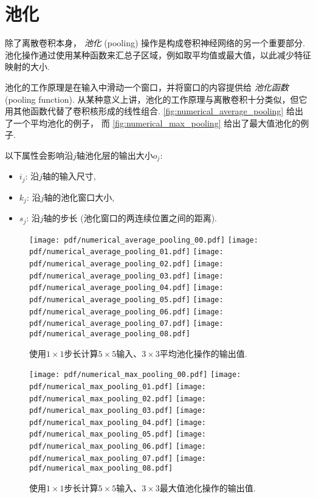 \documentclass[notitlepage]{ctexrep}
\begin{document}
\section{池化}

除了离散卷积本身， {\em 池化\/} (pooling) 操作是构成卷积神经网络的另一个重要部分. 池化操作通过使用某种函数来汇总子区域，例如取平均值或最大值，以此减少特征映射的大小.

池化的工作原理是在输入中滑动一个窗口，并将窗口的内容提供给 {\em 池化函数} (pooling function). 从某种意义上讲，池化的工作原理与离散卷积十分类似，但它用其他函数代替了卷积核形成的线性组合. \autoref{fig:numerical_average_pooling}
给出了一个平均池化的例子， 而 \autoref{fig:numerical_max_pooling}
给出了最大值池化的例子.

以下属性会影响沿$j$轴池化层的输出大小$o_j$: 

\begin{itemize}
    \item $i_j$: 沿$j$轴的输入尺寸,
    \item $k_j$: 沿$j$轴的池化窗口大小,
    \item $s_j$: 沿$j$轴的步长 (池化窗口的两连续位置之间的距离).
\end{itemize}

\begin{figure}[p]
    \centering
    \texttt{[image: pdf/numerical\_average\_pooling\_00.pdf]}
    \texttt{[image: pdf/numerical\_average\_pooling\_01.pdf]}
    \texttt{[image: pdf/numerical\_average\_pooling\_02.pdf]}
    \texttt{[image: pdf/numerical\_average\_pooling\_03.pdf]}
    \texttt{[image: pdf/numerical\_average\_pooling\_04.pdf]}
    \texttt{[image: pdf/numerical\_average\_pooling\_05.pdf]}
    \texttt{[image: pdf/numerical\_average\_pooling\_06.pdf]}
    \texttt{[image: pdf/numerical\_average\_pooling\_07.pdf]}
    \texttt{[image: pdf/numerical\_average\_pooling\_08.pdf]}
    \caption{\label{fig:numerical_average_pooling} 使用$1 \times 1$步长计算$5 \times 5$输入、$3 \times 3$平均池化操作的输出值.}
\end{figure}

\begin{figure}[p]
    \centering
    \texttt{[image: pdf/numerical\_max\_pooling\_00.pdf]}
    \texttt{[image: pdf/numerical\_max\_pooling\_01.pdf]}
    \texttt{[image: pdf/numerical\_max\_pooling\_02.pdf]}
    \texttt{[image: pdf/numerical\_max\_pooling\_03.pdf]}
    \texttt{[image: pdf/numerical\_max\_pooling\_04.pdf]}
    \texttt{[image: pdf/numerical\_max\_pooling\_05.pdf]}
    \texttt{[image: pdf/numerical\_max\_pooling\_06.pdf]}
    \texttt{[image: pdf/numerical\_max\_pooling\_07.pdf]}
    \texttt{[image: pdf/numerical\_max\_pooling\_08.pdf]}
    \caption{\label{fig:numerical_max_pooling} 使用$1 \times 1$步长计算$5 \times 5$输入、$3 \times 3$最大值池化操作的输出值.}
\end{figure}
\end{document}
